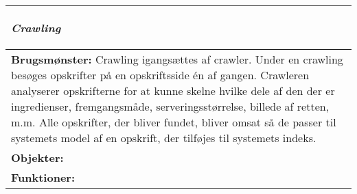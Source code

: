 \begin{tabular}{p{\textwidth}}
    \hline
    \begin{center} 
    \textbf{\textit{Crawling}} 
    \end{center} \\ \hline
    \textbf{Brugsmønster:} Crawling igangsættes af crawler. Under en crawling besøges opskrifter på en opskriftsside én af gangen. Crawleren analyserer opskrifterne for at kunne skelne hvilke dele af den der er ingredienser, fremgangsmåde, serveringsstørrelse, billede af retten, m.m. Alle opskrifter, der bliver fundet, bliver omsat så de passer til systemets model af en opskrift, der tilføjes til systemets indeks.  \\
    \textbf{Objekter:}  \\
    \textbf{Funktioner:}  \\ \hline
\end{tabular}
